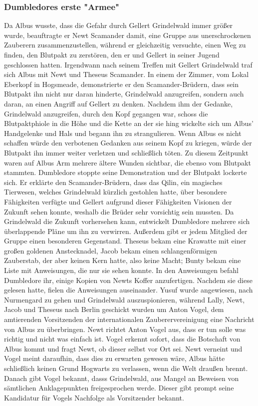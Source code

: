 \documentclass[a4paper, 10pt]{article}
\begin{document}
\subsubsection*{Dumbledores erste "Armee"}
Da Albus wusste, dass die Gefahr durch Gellert Grindelwald immer größer wurde, beauftragte er Newt Scamander damit, eine Gruppe aus unerschrockenen Zauberern zusammenzustellen, während er gleichzeitig versuchte, einen Weg zu finden, den Blutpakt zu zerstören, den er und Gellert in seiner Jugend geschlossen hatten.
\vspace{10pt}
\newline
Irgendwann nach seinem Treffen mit Gellert Grindelwald traf sich Albus mit Newt und Theseus Scamander. In einem der Zimmer, vom Lokal Eberkopf in Hogsmeade, demonstrierte er den Scamander-Brüdern, dass sein Blutpakt ihn nicht nur daran hinderte, Grindelwald anzugreifen, sondern auch daran, an einen Angriff auf Gellert zu denken. Nachdem ihm der Gedanke,
Grindelwald anzugreifen, durch den Kopf gegangen war, schoss die Blutpaktphiole in die Höhe und die Kette an der sie hing wickelte sich um Albus' Handgelenke und Hals und begann ihn zu strangulieren. Wenn Albus es nicht schaffen würde den verbotenen Gedanken aus seinem Kopf zu kriegen, würde der Blutpakt ihn immer weiter verletzen und schließlich töten. Zu diesem Zeitpunkt waren auf Albus Arm mehrere ältere Wunden sichtbar, die ebenso vom Blutpakt stammten. Dumbledore stoppte seine Demonstration und der Blutpakt lockerte sich. Er erklärte den Scamander-Brüdern, dass das Qilin, ein magisches Tierwesen, welches Grindelwald kürzlich gestohlen hatte, über besondere Fähigkeiten verfügte und Gellert aufgrund dieser Fähigkeiten Visionen der Zukunft sehen konnte, weshalb die Brüder sehr vorsichtig sein mussten.
\vspace{10pt}
\newline
Da Grindelwald die Zukunft vorhersehen kann, entwickelt Dumbledore mehrere sich überlappende Pläne um ihn zu verwirren. Außerdem gibt er jedem Mitglied der Gruppe einen besonderen Gegenstand. Theseus bekam eine Krawatte mit einer großen goldenen Anstecknadel, Jacob bekam einen schlangenförmigen Zauberstab, der aber keinen Kern hatte, also keine Macht; Bunty bekam eine Liste mit Anweisungen, die nur sie sehen konnte. In den Anweisungen befahl Dumbledore ihr, einige Kopien von Newts Koffer anzufertigen. Nachdem sie diese gelesen hatte, fielen die Anweisungen auseinander. Yusuf wurde angewiesen, nach Nurmengard zu gehen und Grindelwald auszuspionieren, während Lally, Newt, Jacob und Theseus nach Berlin geschickt wurden um Anton Vogel, dem amtierenden Vorsitzenden der internationalen Zauberervereinigung eine Nachricht von Albus zu überbringen. Newt richtet Anton Vogel aus, dass er tun solle was richtig und nicht was einfach ist. Vogel erkennt sofort, dass die Botschaft von Albus kommt und fragt Newt, ob dieser selbst vor Ort sei. Newt verneint und Vogel meint daraufhin, dass dies zu erwarten gewesen wäre, Albus hätte schließlich keinen Grund Hogwarts zu verlassen, wenn die Welt draußen brennt. Danach gibt Vogel bekannt, dasss Grindelwald, aus Mangel an Beweisen von sämtlichen Anklagepunkten freigesprochen werde. Dieser gibt prompt seine Kandidatur für Vogels Nachfolge als Vorsitzender bekannt.
\end{document}
